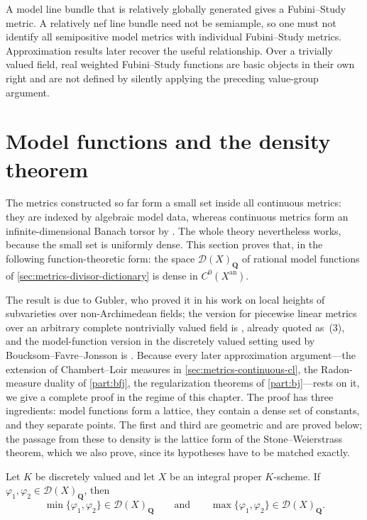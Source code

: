 \begin{remark}
\label{rem:metrics-fs-vs-nef}
A model line bundle that is relatively globally generated gives a
Fubini--Study metric. A relatively nef line bundle need not be semiample, so
one must not identify all semipositive model metrics with individual
Fubini--Study metrics. Approximation results later recover the useful
relationship. Over a trivially valued field, real weighted Fubini--Study
functions are basic objects in their own right and are not defined by
silently applying the preceding value-group argument.
\end{remark}

\section{Model functions and the density theorem}
\label{sec:metrics-model-functions}

The metrics constructed so far form a small set inside all continuous
metrics: they are indexed by algebraic model data, whereas continuous metrics form an
infinite-dimensional Banach torsor by .
The whole theory nevertheless works, because the small set is uniformly
dense. This section proves that, in the following function-theoretic form:
the space $\mathcal D(X)_{\mathbf Q}$ of rational model functions of
\cref{sec:metrics-divisor-dictionary} is dense in $C^0(X^{\mathrm{an}})$.

The result is due to Gubler, who proved it in his work on local heights of
subvarieties over non-Archimedean fields; the version for piecewise linear
metrics over an arbitrary complete nontrivially valued field is
\cite[Theorem~2.17]{GM19}, already quoted as
\,(3), and the model-function version in the
discretely valued setting used by Boucksom--Favre--Jonsson is
\cite[\S2]{BFJ16}. Because every later approximation argument---the
extension of Chambert--Loir measures in \cref{sec:metrics-continuous-cl},
the Radon-measure duality of \cref{part:bfj}, the regularization theorems of
\cref{part:bj}---rests on it, we give a complete proof in the regime of this
chapter. The proof has three ingredients: model functions form a lattice,
they contain a dense set of constants, and they separate points. The first
and third are geometric and are proved below; the passage from these to
density is the lattice form of the Stone--Weierstrass theorem, which we also
prove, since its hypotheses have to be matched exactly.

\begin{lemma}
\label{lem:metrics-model-lattice}
Let $K$ be discretely valued and let $X$ be an integral proper
$K$-scheme. If $\varphi_1,\varphi_2\in\mathcal D(X)_{\mathbf Q}$, then
\[
 \min\{\varphi_1,\varphi_2\}\in\mathcal D(X)_{\mathbf Q}
 \qquad\text{and}\qquad
 \max\{\varphi_1,\varphi_2\}\in\mathcal D(X)_{\mathbf Q}.
\]
\end{lemma}


